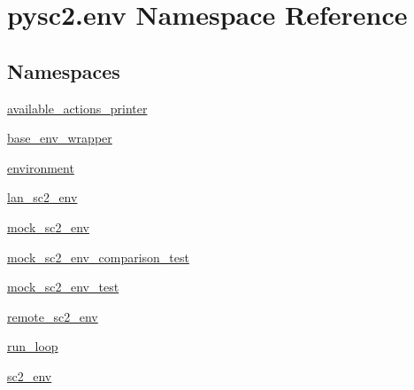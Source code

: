 \hypertarget{namespacepysc2_1_1env}{}\section{pysc2.\+env Namespace Reference}
\label{namespacepysc2_1_1env}
\subsection*{Namespaces}
\begin{DoxyCompactItemize}
\item 
 \mbox{\hyperlink{namespacepysc2_1_1env_1_1available__actions__printer}{available\+\_\+actions\+\_\+printer}}
\item 
 \mbox{\hyperlink{namespacepysc2_1_1env_1_1base__env__wrapper}{base\+\_\+env\+\_\+wrapper}}
\item 
 \mbox{\hyperlink{namespacepysc2_1_1env_1_1environment}{environment}}
\item 
 \mbox{\hyperlink{namespacepysc2_1_1env_1_1lan__sc2__env}{lan\+\_\+sc2\+\_\+env}}
\item 
 \mbox{\hyperlink{namespacepysc2_1_1env_1_1mock__sc2__env}{mock\+\_\+sc2\+\_\+env}}
\item 
 \mbox{\hyperlink{namespacepysc2_1_1env_1_1mock__sc2__env__comparison__test}{mock\+\_\+sc2\+\_\+env\+\_\+comparison\+\_\+test}}
\item 
 \mbox{\hyperlink{namespacepysc2_1_1env_1_1mock__sc2__env__test}{mock\+\_\+sc2\+\_\+env\+\_\+test}}
\item 
 \mbox{\hyperlink{namespacepysc2_1_1env_1_1remote__sc2__env}{remote\+\_\+sc2\+\_\+env}}
\item 
 \mbox{\hyperlink{namespacepysc2_1_1env_1_1run__loop}{run\+\_\+loop}}
\item 
 \mbox{\hyperlink{namespacepysc2_1_1env_1_1sc2__env}{sc2\+\_\+env}}
\end{DoxyCompactItemize}
